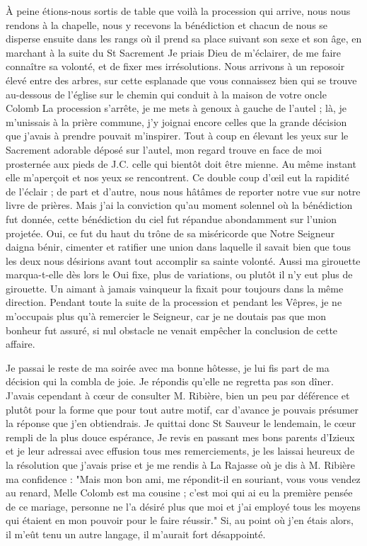 \documentclass[11pt,a4paper]{report}
\begin{document}
À peine étions-nous sortis de table que voilà la procession qui arrive, nous nous rendons à la chapelle, nous y recevons la bénédiction et chacun de nous se disperse ensuite dans les rangs où il prend sa place suivant son sexe et son âge, en marchant à la suite du St Sacrement Je priais Dieu de m'éclairer, de me faire connaître sa volonté, et de fixer mes irrésolutions. Nous arrivons à un reposoir élevé entre des arbres, sur cette esplanade que vous connaissez bien qui se trouve au-dessous de l'église sur le chemin qui conduit à la maison de votre oncle Colomb La procession s'arrête, je me mets à genoux à gauche de l'autel ; là, je m'unissais à la prière commune, j'y joignai encore celles que la grande décision que j'avais à prendre pouvait m'inspirer. Tout à coup en élevant les yeux sur le Sacrement adorable déposé sur l'autel, mon regard trouve en face de moi prosternée aux pieds de J.C. celle qui bientôt doit être mienne. Au même instant elle m'aperçoit et nos yeux se rencontrent. Ce double coup d'œil eut la rapidité de l'éclair ; de part et d'autre, nous nous hâtâmes de reporter notre vue sur notre livre de prières. Mais j'ai la conviction qu'au moment solennel où la bénédiction fut donnée, cette bénédiction du ciel fut répandue abondamment sur l'union projetée. Oui, ce fut du haut du trône de sa miséricorde que Notre Seigneur daigna bénir, cimenter et ratifier une union dans laquelle il savait bien que tous les deux nous désirions avant tout accomplir sa sainte volonté. Aussi ma girouette marqua-t-elle dès lors le Oui fixe, plus de variations, ou plutôt il n'y eut plus de girouette. Un aimant à jamais vainqueur la fixait pour toujours dans la même direction. Pendant toute la suite de la procession et pendant les Vêpres, je ne m'occupais plus qu'à remercier le Seigneur, car je ne doutais pas que mon bonheur fut assuré, si nul obstacle ne venait empêcher la conclusion de cette affaire.

Je passai le reste de ma soirée avec ma bonne hôtesse, je lui fis part de ma décision qui la combla de joie. Je répondis qu'elle ne regretta pas son dîner. J'avais cependant à cœur de consulter M. Ribière, bien un peu par déférence et plutôt pour la forme que pour tout autre motif, car d'avance je pouvais présumer la réponse que j'en obtiendrais. Je quittai donc St Sauveur le lendemain, le cœur rempli de la plus douce espérance, Je revis en passant mes bons parents d'Izieux et je leur adressai avec effusion tous mes remerciements, je les laissai heureux de la résolution que j'avais prise et je me rendis à La Rajasse où je dis à M. Ribière ma confidence : "Mais mon bon ami, me répondit-il en souriant, vous vous vendez au renard, Melle Colomb est ma cousine ; c'est moi qui ai eu la première pensée de ce mariage, personne ne l'a désiré plus que moi et j'ai employé tous les moyens qui étaient en mon pouvoir pour le faire réussir." Si, au point où j'en étais alors, il m'eût tenu un autre langage, il m'aurait fort désappointé.
\end{document}

